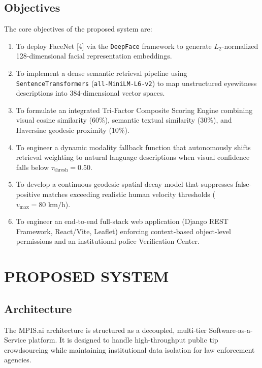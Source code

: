 \documentclass[12pt,a4paper]{report}
\begin{document}
\section{Objectives}
The core objectives of the proposed system are:
\begin{enumerate}
    \item To deploy FaceNet [4] via the \texttt{DeepFace} framework to generate $L_2$-normalized 128-dimensional facial representation embeddings.
    \item To implement a dense semantic retrieval pipeline using \texttt{SentenceTransformers} (\texttt{all-MiniLM-L6-v2}) to map unstructured eyewitness descriptions into 384-dimensional vector spaces.
    \item To formulate an integrated Tri-Factor Composite Scoring Engine combining visual cosine similarity (60\%), semantic textual similarity (30\%), and Haversine geodesic proximity (10\%).
    \item To engineer a dynamic modality fallback function that autonomously shifts retrieval weighting to natural language descriptions when visual confidence falls below $\tau_{\text{thresh}} = 0.50$.
    \item To develop a continuous geodesic spatial decay model that suppresses false-positive matches exceeding realistic human velocity thresholds ($v_{\text{max}} = 80\text{ km/h}$).
    \item To engineer an end-to-end full-stack web application (Django REST Framework, React/Vite, Leaflet) enforcing context-based object-level permissions and an institutional police Verification Center.
\end{enumerate}


\chapter{PROPOSED SYSTEM}

\section{Architecture}
The MPIS.ai architecture is structured as a decoupled, multi-tier Software-as-a-Service platform. It is designed to handle high-throughput public tip crowdsourcing while maintaining institutional data isolation for law enforcement agencies.
\end{document}
